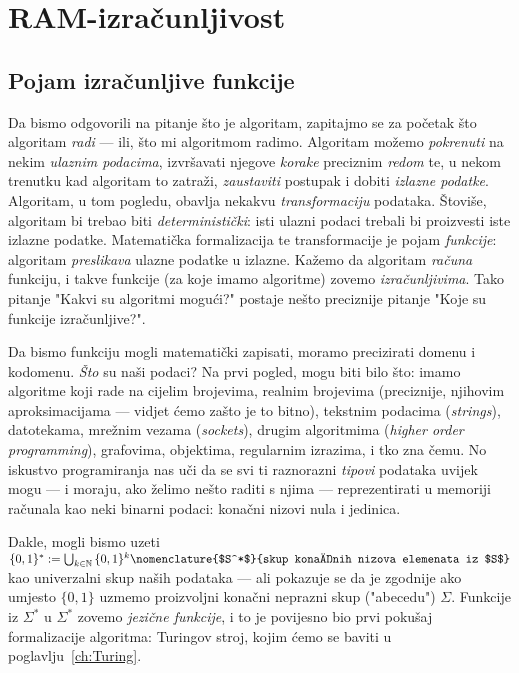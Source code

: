 \chapter{RAM-izračunljivost}

\section{Pojam izračunljive funkcije}

Da bismo odgovorili na pitanje što je algoritam, zapitajmo se za početak što algoritam \emph{radi}  --- ili, što mi algoritmom radimo. Algoritam možemo \emph{pokrenuti} na nekim \emph{ulaznim podacima}, izvršavati njegove \emph{korake} preciznim \emph{redom} te, u nekom trenutku kad algoritam to zatraži, \emph{zaustaviti} postupak i dobiti \emph{izlazne podatke}. Algoritam, u tom pogledu, obavlja nekakvu \emph{transformaciju} podataka. Štoviše, algoritam bi trebao biti \emph{deterministički}: isti ulazni podaci trebali bi proizvesti iste izlazne podatke. Matematička formalizacija te transformacije je pojam \emph{funkcije}: algoritam \emph{preslikava} ulazne podatke u izlazne. Kažemo da algoritam \emph{računa} funkciju, i takve funkcije (za koje imamo algoritme) zovemo \emph{izračunljivima}. Tako pitanje "Kakvi su algoritmi mogući?" postaje nešto preciznije pitanje "Koje su funkcije izračunljive?".


Da bismo funkciju mogli matematički zapisati, moramo precizirati domenu i kodomenu. \emph{Što} su naši podaci?
Na prvi pogled, mogu biti bilo što: imamo algoritme koji rade na cijelim brojevima, realnim brojevima (preciznije, njihovim aproksimacijama --- vidjet ćemo zašto je to bitno), tekstnim podacima (\emph{strings}), datotekama, mrežnim vezama (\emph{sockets}), drugim algoritmima (\emph{higher order programming}), grafovima, objektima, regularnim izrazima, i tko zna čemu. No iskustvo programiranja nas uči da se svi ti raznorazni \emph{tipovi} podataka uvijek mogu --- i moraju, ako želimo nešto raditi s njima --- reprezentirati u memoriji računala kao neki binarni podaci: konačni nizovi nula i jedinica.

Dakle, mogli bismo uzeti $\{0,1\}^*:=\bigcup_{k\in\mathbb N}\,\{0,1\}^k\nomenclature{$S^*$}{skup konačnih nizova elemenata iz $S$}$ kao univerzalni skup naših podataka --- ali pokazuje se da je zgodnije ako umjesto $\{0,1\}$ uzmemo proizvoljni konačni neprazni skup ("abecedu") $\Sigma$. Funkcije iz $\Sigma^*$ u $\Sigma^*$ zovemo \emph{jezične funkcije}, i to je povijesno bio prvi pokušaj formalizacije algoritma: Turingov stroj, kojim ćemo se baviti u poglavlju~\ref{ch:Turing}.

